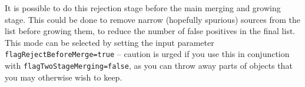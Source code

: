 It is possible to do this rejection stage before the main merging and
growing stage. This could be done to remove narrow (hopefully
spurious) sources from the list before growing them, to reduce the
number of false positives in the final list. This mode can be selected
by setting the input parameter \texttt{flagRejectBeforeMerge=true} --
caution is urged if you use this in conjunction with
\texttt{flagTwoStageMerging=false}, as you can throw away parts of
objects that you may otherwise wish to keep.

